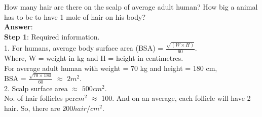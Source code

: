 \documentclass[11pt]{exam}
\begin{document}
\begin{questions}
  
  
\question
\label{Q3:Hair}

How many hair are there on the scalp of average adult human? How big a animal has to be to have 1 mole of hair on his body? \\
\textbf{Answer}: \\
\textbf{Step 1}: Required information.\\
                1. For humans, average body surface area (BSA)  = $\frac{\sqrt{(W \times H)}}
                   {60}$.\\
                   Where, W = weight in kg and H = height in centimetres.\\
                   For average adult human with weight = 70 kg and height = 180 cm, \\
                   BSA = $\frac{\sqrt{70\times180}}{60}$ $\approx$ $2m^{2}$.\\
                   
                2. Scalp surface area $\approx$ $500cm^{2}$.\\
                   No. of hair follicles per$cm^{2}$ $\approx$ 100. And on an average, each 
                  follicle will have 2 hair. So, there are $200 hair/cm^{2}$.\\ 
                   
\end{questions}
\end{document}
